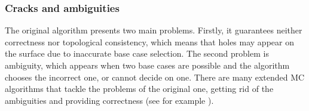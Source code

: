 \subsubsection{Cracks and ambiguities}
The original algorithm presents two main problems. Firstly, it guarantees neither correctness nor topological consistency, which means that holes may appear on the surface due to inaccurate base case selection. The second problem is ambiguity, which appears when two base cases are possible and the algorithm chooses the incorrect one, or cannot decide on one. There are many extended \ac{MC} algorithms that tackle the problems of the original one, getting rid of the ambiguities and providing correctness (see for example \cite{ExtendedMC}).
